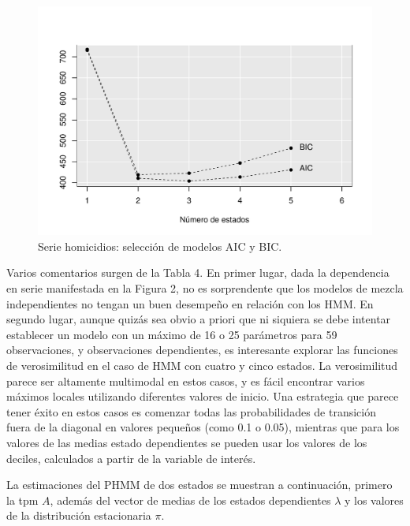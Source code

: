 \documentclass[a4paper]{article}\usepackage[]{graphicx}\usepackage[]{color}
\makeatletter
\def\maxwidth{ %
  \ifdim\Gin@nat@width>\linewidth
    \linewidth
  \else
    \Gin@nat@width
  \fi
}
\newenvironment{knitrout}{}{} %
\makeatother
\begin{document}
\begin{knitrout}
\color{fgcolor}\begin{figure}[h]
\includegraphics[width=\maxwidth]{figure/unnamed-chunk-12-1} \caption[Serie homicidios]{Serie homicidios: selección de modelos AIC y BIC.}\label{fig:unnamed-chunk-12}
\end{figure}


\end{knitrout}

Varios comentarios surgen de la Tabla 4. En primer lugar, dada la dependencia en serie manifestada en la Figura 2, no es sorprendente que los modelos de mezcla independientes no tengan un buen desempeño en relación con los HMM. En segundo lugar, aunque quizás sea obvio a priori que ni siquiera se debe intentar establecer un modelo con un máximo de 16 o 25 parámetros para 59 observaciones, y observaciones dependientes, es interesante explorar las funciones de verosimilitud en el caso de HMM con cuatro y cinco estados. La verosimilitud parece ser altamente multimodal en estos casos, y es fácil encontrar varios máximos locales utilizando diferentes valores de inicio. Una estrategia que parece tener éxito en estos casos es comenzar todas las probabilidades de transición fuera de la diagonal en valores pequeños (como 0.1 o 0.05), mientras que para los valores de las medias estado dependientes se pueden usar los valores de los deciles, calculados a partir de la variable de interés.



La estimaciones del PHMM de dos estados se muestran a continuación, primero la tpm $A$, además del vector de medias de los estados dependientes $\lambda$ y los valores de la distribución estacionaria $\pi$. 
\end{document}
